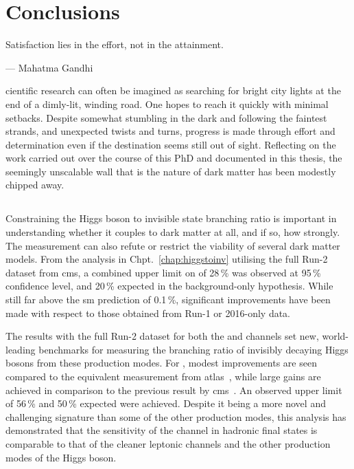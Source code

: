 \chapter{Conclusions}
\label{chap:conclusions}

\epigraph{Satisfaction lies in the effort, not in the attainment.}{--- Mahatma Gandhi}

cientific research can often be imagined as searching for bright city lights at the end of a dimly-lit, winding road. One hopes to reach it quickly with minimal setbacks. Despite somewhat stumbling in the dark and following the faintest strands, and unexpected twists and turns, progress is made through effort and determination even if the destination seems still out of sight. Reflecting on the work carried out over the course of this PhD and documented in this thesis, the seemingly unscalable wall that is the nature of dark matter has been modestly chipped away.




\section{\texorpdfstring{\higgstoinv}{Higgs to invisible}}
\label{sec:conclusions_htoinv}

Constraining the Higgs boson to invisible state branching ratio is important in understanding whether it couples to dark matter at all, and if so, how strongly. The measurement can also refute or restrict the viability of several dark matter models. From the analysis in Chpt.~\ref{chap:higgstoinv} utilising the full Run-2 dataset from \acrshort{cms}, a combined upper limit on \BRHinvFull of 28\,\% was observed at 95\,\% confidence level, and 20\,\% expected in the background-only hypothesis. While still far above the \acrlong{sm} prediction of 0.1\,\%, significant improvements have been made with respect to those obtained from Run-1 or 2016-only data.

The results with the full Run-2 dataset for both the \ttH and \VH channels set new, world-leading benchmarks for measuring the branching ratio of invisibly decaying Higgs bosons from these production modes. For \ttH, modest improvements are seen compared to the equivalent measurement from \acrshort{atlas}~\cite{ATLAS:2020kdi}, while large gains are achieved in comparison to the previous result by \acrshort{cms}~\cite{CMS-PAS-HIG-18-008}. An observed upper limit of 56\,\% and 50\,\% expected were achieved. Despite it being a more novel and challenging signature than some of the other production modes, this analysis has demonstrated that the sensitivity of the \ttH channel in hadronic final states is comparable to that of the cleaner leptonic channels and the other production modes of the Higgs boson.

